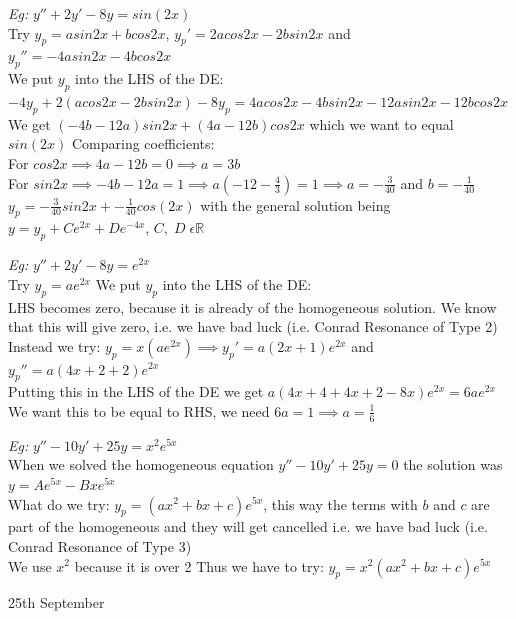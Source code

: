 \documentclass[11pt]{article}
\theoremstyle{definition}
\newcommand{\R}{\mathbb{R}}
\begin{document}
\textit{Eg:} $y'' + 2y' - 8y = sin(2x)$\\
Try $y_p = asin2x + bcos2x$, $y_p' = 2acos2x -2bsin2x$ and $y_p'' = -4asin2x - 4bcos2x$\\

We put $y_p$ into the LHS of the DE:\\
$-4y_p + 2(acos2x - 2bsin2x) -8y_p = 4acos2x - 4bsin2x -12asin2x - 12bcos2x$\\
We get $(-4b-12a)sin2x + (4a-12b)cos2x$ which we want to equal $sin(2x)$
Comparing coefficients:\\
For $cos2x \implies 4a-12b = 0 \implies a = 3b$\\
For $sin2x \implies -4b-12a = 1 \implies a(-12 - \frac{4}{3}) = 1 \implies a = -\frac{3}{40}$ and $b = -\frac{1}{40}$\\

$y_p = -\frac{3}{40}sin2x + -\frac{1}{40}cos(2x)$ with the general solution being $y = y_p + Ce^{2x} + De^{-4x}$, $C,\;D\;\epsilon \R$

\textit{Eg:} $y'' + 2y' - 8y = e^{2x}$\\
Try $y_p = ae^{2x}$
We put $y_p$ into the LHS of the DE:\\
LHS becomes zero, because it is already of the homogeneous solution.
We know that this will give zero, i.e. we have bad luck (i.e. Conrad Resonance of Type 2)\\ 
Instead we try: 
$y_p = x(ae^{2x}) \implies y_p' = a(2x+1)e^{2x}$ and $y_p'' = a(4x+2+2)e^{2x}$\\
Putting this in the LHS of the DE we get $a(4x + 4 + 4x + 2 - 8x)e^{2x} = 6ae^{2x}$\\
We want this to be equal to RHS, we need $6a = 1 \implies a = \frac{1}{6}$



\textit{Eg:} $y'' - 10y' +25y = x^2e^{5x}$\\
When we solved the homogeneous equation $y'' - 10y' +25y = 0$ the solution was $y = Ae^{5x} - Bxe^{5x}$\\
What do we try: $y_p = (ax^2+bx+c)e^{5x}$, this way the terms with $b$ and $c$ are part of the homogeneous and they will get cancelled i.e. we have bad luck (i.e. Conrad Resonance of Type 3)\\
We use $x^2$ because it is over 2
Thus we have to try: $y_p = x^2(ax^2+bx+c)e^{5x}$

\newpage
\begin{center}
    {\LARGE 25th September}\\
\end{center}
\end{document}
